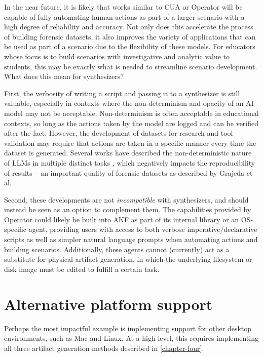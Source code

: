 \documentclass[letterpaper,12pt]{report}
\begin{document}
In the near future, it is likely that works similar to CUA or Operator
will be capable of fully automating human actions as part of a larger
scenario with a high degree of reliability and accuracy. Not only does
this accelerate the process of building forensic datasets, it also
improves the variety of applications that can be used as part of a
scenario due to the flexibility of these models. For educators whose
focus is to build scenarios with investigative and analytic value to
students, this may be exactly what is needed to streamline scenario
development. What does this mean for synthesizers?

First, the verbosity of writing a script and passing it to a synthesizer
is still valuable, especially in contexts where the non-determinism and
opacity of an AI model may not be acceptable. Non-determinism is often
acceptable in educational contexts, so long as the actions taken by the
model are logged and can be verified after the fact. However, the
development of datasets for research and tool validation may require
that actions are taken in a specific manner every time the dataset is
generated. Several works have described the non-deterministic nature of
LLMs in multiple distinct tasks
\cite{astekinExploratoryStudyHow2024,songGoodBadGreedy2024,ouyangEmpiricalStudyNonDeterminism2025},
which negatively impacts the reproducibility of results -- an important
quality of forensic datasets as described by Grajeda et al.
\cite{grajedaAvailabilityDatasetsDigital2017}.

Second, these developments are not \emph{incompatible} with
synthesizers, and should instead be seen as an option to complement
them. The capabilities provided by Operator could likely be built into
AKF as part of its internal library or an OS-specific agent, providing
users with access to both verbose imperative/declarative scripts as well
as simpler natural language prompts when automating actions and building
scenarios. Additionally, these agents cannot (currently) act as a
substitute for physical artifact generation, in which the underlying
filesystem or disk image must be edited to fulfill a certain task.

\section{Alternative platform
support}\label{alternative-platform-support}

Perhaps the most impactful example is implementing support for other
desktop environments, such as Mac and Linux. At a high level, this
requires implementing all three artifact generation methods described in
\autoref{chapter-four}.
\end{document}
